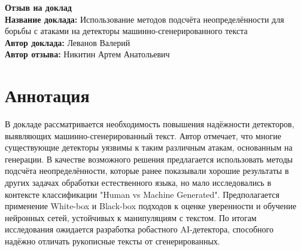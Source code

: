 \documentclass[11pt]{article}
\begin{document}
\begin{center}
    {\Large \textbf{Отзыв на доклад}}\\[1em]
    {\large \textbf{Название доклада:} Использование методов подсчёта неопределённости для борьбы с атаками на детекторы машинно-сгенерированного текста}\\[0.5em]
    {\large \textbf{Автор доклада:} Леванов Валерий}\\[0.5em]
    {\large \textbf{Автор отзыва:} Никитин Артем Анатольевич}\\[2em]
\end{center}

\section*{Аннотация}
В докладе рассматривается необходимость повышения надёжности детекторов, выявляющих машинно-сгенерированный текст.
Автор отмечает, что многие существующие детекторы уязвимы к таким различным атакам, основанным на генерации. В качестве
возможного решения предлагается использовать методы подсчёта неопределённости, которые ранее
показывали хорошие результаты в других задачах обработки естественного языка, но мало исследовались в контексте
классификации "Human vs Machine Generated". Предполагается применение White-box и Black-box подходов к оценке уверенности
и обучение нейронных сетей, устойчивых к манипуляциям с текстом. По итогам исследования ожидается разработка робастного
AI-детектора, способного надёжно отличать рукописные тексты от сгенерированных.

\end{document}
